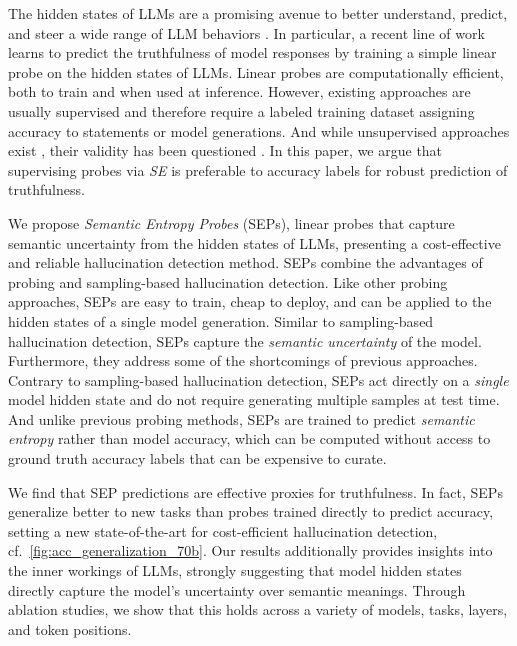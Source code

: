 \documentclass{article}
\begin{document}
The hidden states of LLMs are a promising avenue to better understand, predict, and steer a wide range of LLM behaviors \citep{zou2023representation,hernandez2023measuring,subramani2022extracting}.
In particular, a recent line of work learns to predict the truthfulness of model responses by training a simple linear probe on the hidden states of LLMs. Linear probes are computationally efficient, both to train and when used at inference.
However, existing approaches are usually supervised \citep{rimsky2023steering,li2024inference,azaria2023internal,marks2023geometry} and therefore require a labeled training dataset assigning accuracy to statements or model generations.
And while unsupervised approaches exist \citep{burns2024discovering}, their validity has been questioned \citep{farquhar2023challenges}.
In this paper, we argue that supervising probes via \emph{SE} is preferable to accuracy labels for robust prediction of truthfulness.

We propose \emph{Semantic Entropy Probes} (SEPs), linear probes that capture semantic uncertainty from the hidden states of LLMs, presenting a cost-effective and reliable hallucination detection method.
SEPs combine the advantages of probing and sampling-based hallucination detection.
Like other probing approaches, SEPs are easy to train, cheap to deploy, and can be applied to the hidden states of a single model generation.
Similar to sampling-based hallucination detection, SEPs capture the \emph{semantic uncertainty} of the model. 
Furthermore, they address some of the shortcomings of previous approaches.
Contrary to sampling-based hallucination detection, SEPs act directly on a \emph{single} model hidden state and do not require generating multiple samples at test time.
And unlike previous probing methods, SEPs are trained to predict \emph{semantic entropy} \citep{kuhn2023semantic} rather than model accuracy, which can be computed without access to ground truth accuracy labels that can be expensive to curate.

We find that SEP predictions are effective proxies for truthfulness.
In fact, SEPs generalize better to new tasks than probes trained directly to predict accuracy, setting a new state-of-the-art for cost-efficient hallucination detection, cf.~\cref{fig:acc_generalization_70b}.
Our results additionally provides insights into the inner workings of LLMs, strongly suggesting that model hidden states directly capture the model's uncertainty over semantic meanings.
Through ablation studies, we show that this holds across a variety of models, tasks, layers, and token positions.
\end{document}
